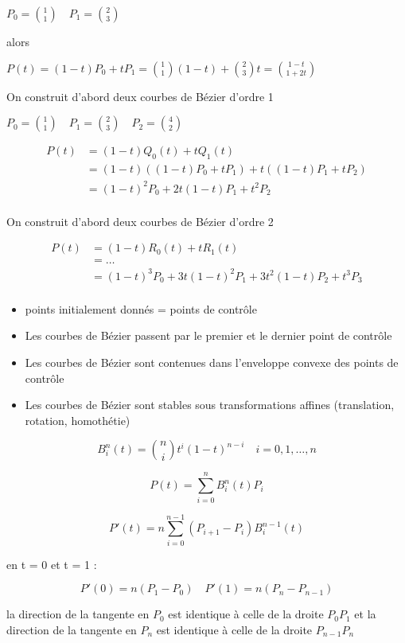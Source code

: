 \hformbar{}




$P_0 = \binom{1}{1} \quad P_1 = \binom{2}{3}$

alors 

$P(t) = (1-t)P_0 + tP_1 = \binom{1}{1}(1-t) + \binom{2}{3}t = \binom{1-t}{1+2t}$


On construit d'abord deux courbes de Bézier d'ordre 1

$P_0 = \binom{1}{1} \quad P_1 = \binom{2}{3} \quad P_2 = \binom{4}{2}$

\begin{align*}
P(t) &= (1-t)Q_0(t) + tQ_1(t) \\
& = (1-t)((1-t)P_0 + tP_1) + t((1-t)P_1 + tP_2) \\
& = (1-t)^2P_0 + 2t(1-t)P_1 + t^2P_2 \\
\end{align*}


On construit d'abord deux courbes de Bézier d'ordre 2   

\begin{align*}
    P(t) &= (1-t)R_0(t) + tR_1(t) \\
    & = \dots \\
    & = (1-t)^3P_0 + 3t(1-t)^2P_1 + 3t^2(1-t)P_2 + t^3P_3 \\
\end{align*}


\begin{itemize}
    \item points initialement donnés = points de contrôle
    \item Les courbes de Bézier passent par le premier et le dernier point de contrôle
    \item Les courbes de Bézier sont contenues dans l'enveloppe convexe des points de contrôle
    \item Les courbes de Bézier sont stables sous transformations affines (translation, rotation, homothétie)
\end{itemize}


$$B_i^n(t) = \binom{n}{i}t^i(1-t)^{n-i} \quad i = 0,1, \dots, n$$


$$P(t) = \sum_{i=0}^{n} B_i^n(t)P_i$$


$$ P'(t) = n \sum_{i=0}^{n-1} (P_{i+1} - P_i) B_i^{n-1}(t)$$

en t = 0 et t = 1 :

$$ P'(0) = n(P_1 - P_0) \quad P'(1) = n(P_n - P_{n-1})$$

la direction de la tangente en $P_0$ est identique à celle de la droite $P_0P_1$
et la direction de la tangente en $P_n$ est identique à celle de la droite $P_{n-1}P_n$